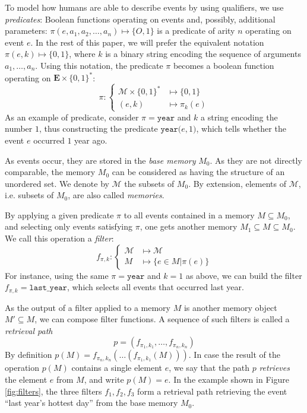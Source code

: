 \documentclass[entropy,article,submit,moreauthors,pdftex]{Definitions/mdpi}
\begin{document}
To model how humans are able to describe events by using qualifiers, we use \emph{predicates}: Boolean functions operating on events and, possibly, additional parameters: $\pi(e, a_1, a_2, \dots, a_n) \mapsto \{O,1\}$ is a predicate of arity $n$ operating on event $e$. In the rest of this paper, we will prefer the equivalent notation $\pi(e, k) \mapsto \{0,1\}$, where $k$ is a binary string encoding the sequence of arguments $a_1, \dots, a_n$. Using this notation, the predicate $\pi$ becomes a boolean function operating on $\mathbf{E} \times \{0,1\}^*$:
\begin{equation}
    \label{eq:predicate}
    \pi : \begin{cases}
        \mathcal{M}\times \{0,1\}^{*} & \mapsto \{0,1\}    \\
        (e, k)                        & \mapsto \pi_{k}(e)
    \end{cases}
\end{equation}
As an example of predicate, consider $\pi = \mathtt{year}$ and $k$ a string encoding the number $1$, thus
constructing the predicate $\mathtt{year(}e, 1\mathtt{)}$, which tells whether
the event $e$ occurred $1$ year ago.

As events occur, they are stored in the  \emph{base memory} $M_0$. As they are not directly comparable, the memory $M_0$ can be considered as having the structure of an unordered set. We denote by $\mathcal{M}$ the subsets of $M_0$. By extension, elements of $\mathcal{M}$, i.e. subsets of $M_0$, are also called \emph{memories}.

By applying a given predicate $\pi$ to all events contained in a memory $M \subseteq M_0$, and selecting only events satisfying $\pi$, one gets another memory $M_1 \subseteq M \subseteq M_0$. We call this operation a \emph{filter}:
\begin{equation}
    \label{eq:filter}
    f_{\pi, k}: \begin{cases}
        \mathcal{M} & \mapsto \mathcal{M}           \\
        M           & \mapsto \{e \in M | \pi(e) \}
    \end{cases}
\end{equation}
For instance, using the same $\pi = \mathtt{year}$ and $k=1$ as above, we can
build the filter $f_{\pi, k} = \mathtt{last\_{}year}$, which selects all events
that occurred last year.

As the output of a filter applied to a memory $M$ is another memory
object $M' \subseteq M$, we can compose filter
functions. A sequence of such filters is called a \emph{retrieval path}
\begin{equation}
    \label{eq:ret_def}
    p = (f_{\pi_{1}, k_{1}}, \dots, f_{\pi_{n}, k_{n}})
\end{equation}
By definition
$p(M) = f_{\pi_{n}, k_{n}}(\dots(f_{\pi_{1}, k_{1}}(M)))$.
In case the result of the operation $p(M)$ contains a single element
$e$, we say that the path $p$ \emph{retrieves} the element $e$ from $M$, and write
$p(M) = e$. In the example shown in Figure \ref{fig:filters}, the three filters $f_1, f_2, f_3$ form a retrieval path retrieving the event ``last year's hottest day'' from the base memory $M_0$.
\end{document}
